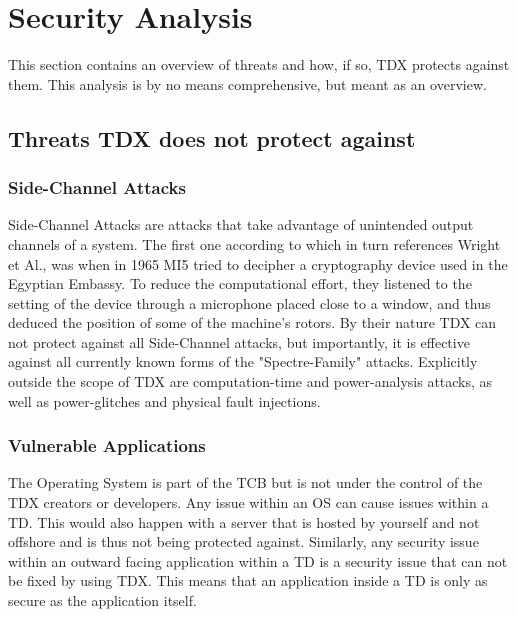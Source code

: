 
\chapter{Security Analysis}
\label{Security Analysis}

This section contains an overview of threats and how, if so, TDX protects against them. This analysis is by no means comprehensive, but meant as an overview.

\section{Threats TDX does not protect against}


\subsection{Side-Channel Attacks}

Side-Channel Attacks are attacks that take advantage of unintended output channels of a system. The first one according to \cite{SideChannelAttacks} which in turn references Wright et Al., was when in 1965 MI5 tried to decipher a cryptography device used in the Egyptian Embassy. To reduce the computational effort, they listened to the setting of the device through a microphone placed close to a window, and thus deduced the position of some of the machine's rotors.
By their nature TDX can not protect against all Side-Channel attacks, but importantly, it is effective against all currently known forms of the "Spectre-Family" attacks. Explicitly outside the scope of TDX are computation-time and power-analysis attacks, as well as power-glitches and physical fault injections.

\subsection{Vulnerable Applications}

The Operating System is part of the \Gls{TCB} but is not under the control of the TDX creators or developers. Any issue within an OS can cause issues within a \Gls{TD}. This would also happen with a server that is hosted by yourself and not offshore and is thus not being protected against. Similarly, any security issue within an outward facing application within a \Gls{TD} is a security issue that can not be fixed by using TDX. This means that an application inside a TD is only as secure as the application itself. 

